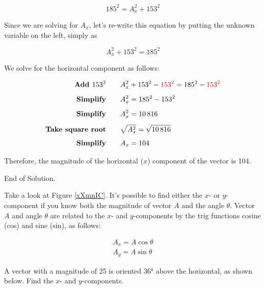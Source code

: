 \documentclass{article}
\begin{document}
\begin{equation*}
    185^2 = A_x^2 + 153^2
\end{equation*}

Since we are solving for $A_x$, let's re-write this equation by putting the unknown variable on the left, simply as 

\begin{equation*}
    A_x^2 + 153^2 = 185^2
\end{equation*}

We solve for the horizontal component as follows:

\begin{align*}
    \textbf{Add $153^2$} \qquad & A_x^2 + 153^2 - \textcolor{red}{153^2} = 185^2 - \textcolor{red}{153^2}\\[1ex]
    \textbf{Simplify} \qquad & A_x^2 = 185^2 - 153^2\\[1ex]
    \textbf{Simplify} \qquad & A_x^2 = \num{10816}\\[1ex]
    \textbf{Take square root} \qquad & \sqrt{A_x^2} = \sqrt{\num{10816}}\\[1ex]
    \textbf{Simplify} \qquad & A_x = 104
\end{align*}

Therefore, the magnitude of the horizontal ($x$) component of the vector is 104.

End of Solution.

Take a look at Figure \ref{xXmnIC}. It's possible to find either the $x$- or $y$-component if you know both the magnitude of vector $A$ and the angle $\theta$. Vector $A$ and angle $\theta$ are related to the $x$- and $y$-components by the trig functions cosine (cos) and sine (sin), as follows:

\begin{align}
    A_x = A \cos{\theta} \label{06CyUc}\\[1ex]
    A_y = A \sin{\theta} \label{aBWDIc}
\end{align}

\begin{example}
    A vector with a magnitude of 25 is oriented \ang{36} above the horizontal, as shown below. Find the $x$- and $y$-components.
\end{example}

\begin{center}
\end{center}
\end{document}
